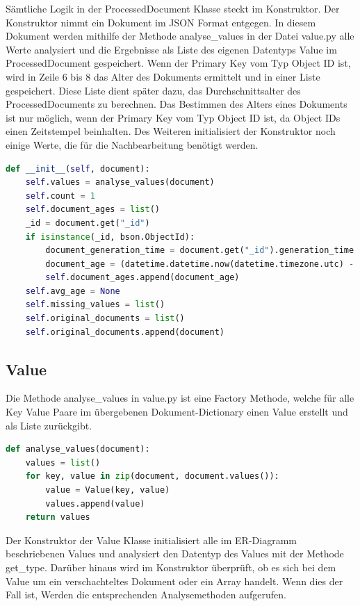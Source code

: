 Sämtliche Logik in der ProcessedDocument Klasse steckt im Konstruktor.
Der Konstruktor nimmt ein Dokument im JSON Format entgegen.
In diesem Dokument werden mithilfe der Methode analyse\_values in der Datei value.py alle Werte analysiert und die Ergebnisse als Liste des eigenen Datentyps Value im ProcessedDocument gespeichert.
Wenn der Primary Key vom Typ Object ID ist, wird in Zeile 6 bis 8 das Alter des Dokuments ermittelt und in einer Liste gespeichert.
Diese Liste dient später dazu, das Durchschnittsalter des ProcessedDocuments zu berechnen.
Das Bestimmen des Alters eines Dokuments ist nur möglich, wenn der Primary Key vom Typ Object ID ist, da Object IDs einen Zeitstempel beinhalten.
Des Weiteren initialisiert der Konstruktor noch einige Werte, die für die Nachbearbeitung benötigt werden.

\begin{lstlisting}[language=python, caption={ProcessedDocument.\_\_init\_\_},label={lst:backend_processed_document_init}]
def __init__(self, document):
    self.values = analyse_values(document)
    self.count = 1
    self.document_ages = list()
    _id = document.get("_id")
    if isinstance(_id, bson.ObjectId):
        document_generation_time = document.get("_id").generation_time
        document_age = (datetime.datetime.now(datetime.timezone.utc) - document_generation_time).total_seconds()
        self.document_ages.append(document_age)
    self.avg_age = None
    self.missing_values = list()
    self.original_documents = list()
    self.original_documents.append(document)
\end{lstlisting}

\subsection{Value}
\label{sub:ba_value}

Die Methode analyse\_values in value.py ist eine Factory Methode, welche für alle Key Value Paare im übergebenen Dokument-Dictionary einen Value erstellt und als Liste zurückgibt.

\begin{lstlisting}[language=python, caption={Value.analyse\_values},label={lst:backend_value_analyse_values}]
def analyse_values(document):
    values = list()
    for key, value in zip(document, document.values()):
        value = Value(key, value)
        values.append(value)
    return values
\end{lstlisting}

Der Konstruktor der Value Klasse initialisiert alle im ER-Diagramm beschriebenen Values und analysiert den Datentyp des Values mit der Methode get\_type.
Darüber hinaus wird im Konstruktor überprüft, ob es sich bei dem Value um ein verschachteltes Dokument oder ein Array handelt. 
Wenn dies der Fall ist, Werden die entsprechenden Analysemethoden aufgerufen.

